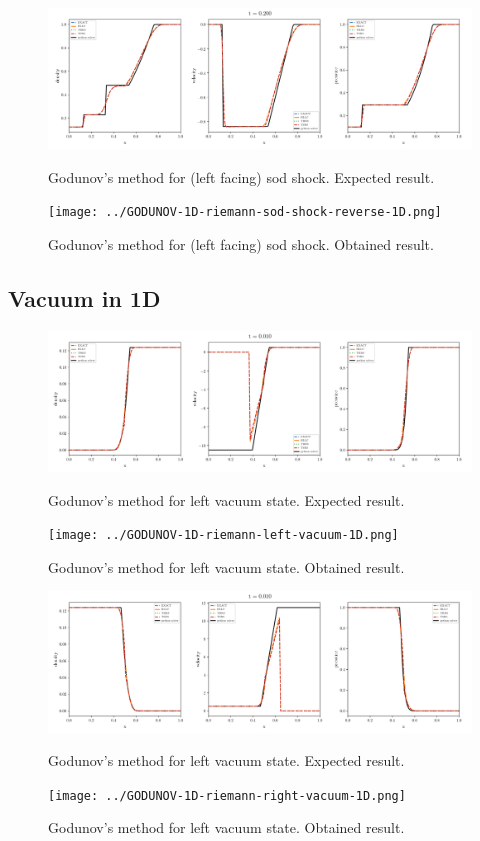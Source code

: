     \begin{figure}[htbp]
        \centering
        \includegraphics[width=.9\textwidth]{./figures/GODUNOV-riemann-sod-shock-reverse-1D.png}%
        \caption{Godunov's method for (left facing) sod shock. Expected result.}
        \texttt{[image: ../GODUNOV-1D-riemann-sod-shock-reverse-1D.png]}%
        \caption{Godunov's method for (left facing) sod shock. Obtained result.}
    \end{figure}










\clearpage
\subsection{Vacuum in 1D}

    \begin{figure}[htbp]
        \centering
        \includegraphics[width=.9\textwidth]{./figures/GODUNOV-riemann-left-vacuum-1D.png}%
        \caption{Godunov's method for left vacuum state. Expected result.}
        \texttt{[image: ../GODUNOV-1D-riemann-left-vacuum-1D.png]}
        \caption{Godunov's method for left vacuum state. Obtained result.}
    \end{figure}


    \begin{figure}[htbp]
        \centering
        \includegraphics[width=.9\textwidth]{./figures/GODUNOV-riemann-right-vacuum-1D.png}%
        \caption{Godunov's method for left vacuum state. Expected result.}
        \texttt{[image: ../GODUNOV-1D-riemann-right-vacuum-1D.png]}
        \caption{Godunov's method for left vacuum state. Obtained result.}
    \end{figure}


